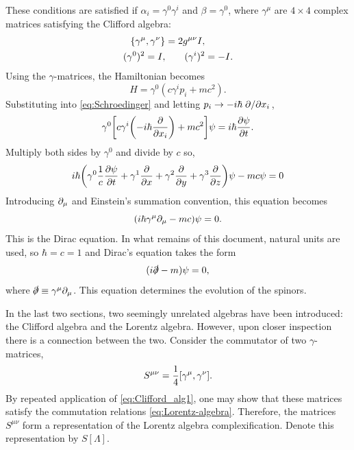 These conditions are satisfied if $\alpha_i = \gamma^0 \gamma^{i}$ and $\beta = \gamma^0$, where $\gamma^\mu$ are $4\times 4$ complex matrices satisfying the Clifford algebra:
\begin{align}
    \pb{\gamma^\mu}{\gamma^\nu} &= 2g^{\mu\nu} I, \label{eq:Clifford_alg1}\\
    (\gamma^0)^2 = I, & \qquad (\gamma^i)^2 = -I. \label{eq:Clifford_alg2}
\end{align}
Using the $\gamma$-matrices, the Hamiltonian becomes $$H = \gamma^0(c\gamma^i p_i+mc^2).$$ Substituting into \eqref{eq:Schroedinger} and letting $p_i \to -i\hbar \pdv*{x_i}$, $$\gamma^0\qty[ c\gamma^i \qty(-i\hbar\pdv{x_i})+mc^2]\psi = i\hbar \pdv{\psi}{t}.$$ Multiply both sides by $\gamma^0$ and divide by $c$ so, 
\begin{gather*}
    i\hbar\qty(\gamma^0 \frac{1}{c}\pdv{\psi}{t}+\gamma^{1}\pdv{x}+\gamma^{2}\pdv{y}+\gamma^{3}\pdv{z})\psi-mc \psi = 0
\end{gather*}
Introducing $\partial_{\mu}$ and Einstein's summation convention, this equation becomes
\begin{equation}\label{eq:Dirac}
    \qty(i\hbar \gamma^\mu \partial_{\mu} - mc)\psi = 0.
\end{equation}
This is the Dirac equation. In what remains of this document, natural units are used, so $\hbar = c = 1$ and Dirac's equation takes the form
\begin{equation}\label{eq:Dirac_nu}
    (i\slashed{\partial}-m)\psi = 0,
\end{equation}
where $\slashed{\partial} \equiv \gamma^\mu \partial_{\mu}$. This equation determines the evolution of the spinors.

In the last two sections, two seemingly unrelated algebras have been introduced: the Clifford algebra and the Lorentz algebra. However, upon closer inspection there is a connection between the two. Consider the commutator of two $\gamma$-matrices, $$S^{\mu\nu} = \frac{1}{4}\comm{\gamma^\mu}{\gamma^\nu}.$$ By repeated application of \eqref{eq:Clifford_alg1}, one may show that these matrices satisfy the commutation relations \eqref{eq:Lorentz-algebra}. Therefore, the matrices $S^{\mu\nu}$ form a representation of the Lorentz algebra complexification. Denote this representation by $S[\Lambda]$. 

